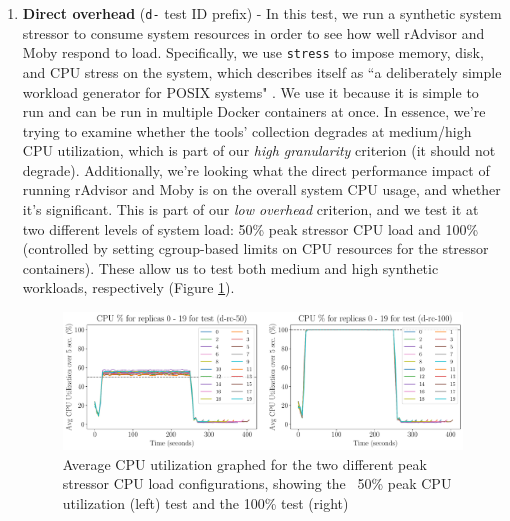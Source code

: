 \documentclass[a4paper,11pt]{article}
\newcommand{\granularity}{\textit{high granularity}\xspace}
\newcommand{\overhead}{\textit{low overhead}\xspace}
\begin{document}
\vspace{-0.2em}
\begin{enumerate}
    \item \textbf{Direct overhead} (\texttt{d-} test ID prefix) -
    In this test, we run a synthetic system stressor to consume system resources
    in order to see how well rAdvisor and Moby respond to load.
    Specifically, we use \texttt{stress} to impose memory, disk, and CPU stress on the system,
    which describes itself as ``a deliberately simple workload generator for POSIX systems" \cite{Stress}.
    We use it because it is simple to run and can be run in multiple Docker containers at once.
    In essence, we're trying to examine whether the tools' collection degrades
    at medium/high CPU utilization,
    which is part of our \granularity criterion (it should not degrade).
    Additionally, we're looking what the direct performance impact of running rAdvisor and Moby
    is on the overall system CPU usage,
    and whether it's significant.
    This is part of our \overhead criterion, and we test it at two different levels of system load:
    50\% peak stressor CPU load and 100\%
    (controlled by setting cgroup-based limits on CPU resources for the stressor containers).
    These allow us to test both medium and high synthetic workloads, respectively (Figure \ref{fig:evaluation_50_100}).
    
    \begin{minipage}{\linewidth}
        \begin{figure}[H]
            \vspace{-0.6em}
            \centering
            \includegraphics[width=\textwidth]{graphs/evaluation_50_100.pdf}
            \vspace{-0.5em}
            \caption{
                Average CPU utilization graphed for the two different peak stressor CPU load configurations,
                showing the ~50\% peak CPU utilization (left) test and the 100\% test (right)
            }
            \label{fig:evaluation_50_100}
        \end{figure}
    \end{minipage}
    

\end{enumerate}
\end{document}
